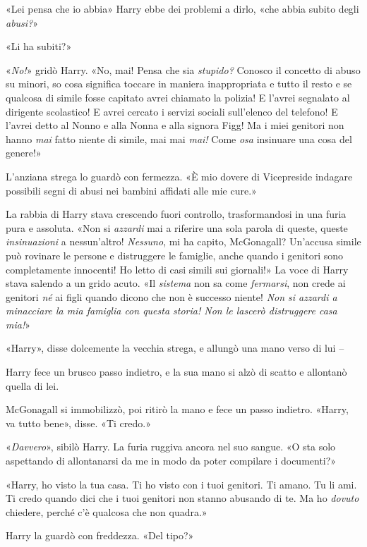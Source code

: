 «Lei pensa che io abbia» Harry ebbe dei problemi a dirlo, «che abbia subito degli \textit{abusi?}»

«Li ha subiti?»

«\textit{No!}» gridò Harry. «No, mai! Pensa che sia \textit{stupido?} Conosco il concetto di abuso su minori, so cosa significa toccare in maniera inappropriata e tutto il resto e se qualcosa di simile fosse capitato avrei chiamato la polizia! E l’avrei segnalato al dirigente scolastico! E avrei cercato i servizi sociali sull’elenco del telefono! E l’avrei detto al Nonno e alla Nonna e alla signora Figg! Ma i miei genitori non hanno \textit{mai} fatto niente di simile, mai mai \textit{mai!} Come \textit{osa} insinuare una cosa del genere!»

L’anziana strega lo guardò con fermezza. «È mio dovere di Vicepreside indagare possibili segni di abusi nei bambini affidati alle mie cure.»

La rabbia di Harry stava crescendo fuori controllo, trasformandosi in una furia pura e assoluta. «Non si \textit{azzardi} mai a riferire una sola parola di queste, queste \textit{insinuazioni} a nessun’altro! \textit{Nessuno}, mi ha capito, McGonagall? Un’accusa simile può rovinare le persone e distruggere le famiglie, anche quando i genitori sono completamente innocenti! Ho letto di casi simili sui giornali!» La voce di Harry stava salendo a un grido acuto. «Il \textit{sistema} non sa come \textit{fermarsi}, non crede ai genitori \textit{né} ai figli quando dicono che non è successo niente! \textit{Non si azzardi a minacciare la mia famiglia con questa storia! Non le lascerò distruggere casa mia!}»

«Harry», disse dolcemente la vecchia strega, e allungò una mano verso di lui –

Harry fece un brusco passo indietro, e la sua mano si alzò di scatto e allontanò quella di lei.

McGonagall si immobilizzò, poi ritirò la mano e fece un passo indietro. «Harry, va tutto bene», disse. «Ti credo.»

«\textit{Davvero}», sibilò Harry. La furia ruggiva ancora nel suo sangue. «O sta solo aspettando di allontanarsi da me in modo da poter compilare i documenti?»

«Harry, ho visto la tua casa. Ti ho visto con i tuoi genitori. Ti amano. Tu li ami. Ti credo quando dici che i tuoi genitori non stanno abusando di te. Ma ho \textit{dovuto} chiedere, perché c’è qualcosa che non quadra.»

Harry la guardò con freddezza. «Del tipo?»

